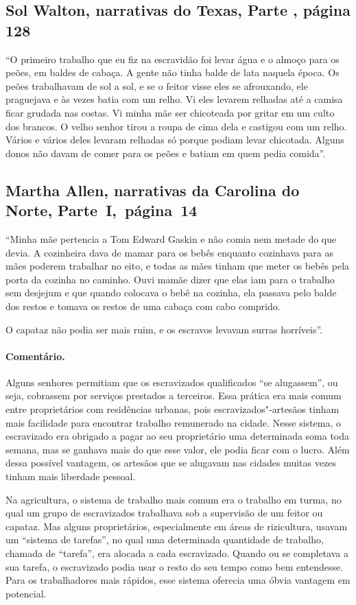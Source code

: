 \subsection{Sol Walton, narrativas do Texas, Parte , página 128}
\label{ref275}

``O primeiro trabalho que eu fiz na escravidão foi levar água e o almoço
para os peões, em baldes de cabaça. A gente não tinha balde de lata
naquela época. Os peões trabalhavam de sol a sol, e se o feitor visse
eles se afrouxando, ele praguejava e às vezes batia com um relho. Vi
eles levarem relhadas até a camisa ficar grudada nas costas. Vi minha
mãe ser chicoteada por gritar em um culto dos brancos. O velho senhor
tirou a roupa de cima dela e castigou com um relho. Vários e vários 
deles levaram relhadas só porque podiam levar chicotada. Alguns donos
não davam de comer para os peões e batiam em quem pedia comida''.

\subsection{Martha Allen, narrativas da Carolina do Norte, Parte~I,~página~14} \label{ref06}

``Minha mãe pertencia a Tom Edward Gaskin e não comia nem metade do que
devia. A cozinheira dava de mamar para os bebês enquanto cozinhava para
as mães poderem trabalhar no eito, e todas as mães tinham que meter os
bebês pela porta da cozinha no caminho. Ouvi mamãe dizer que elas iam
para o trabalho sem desjejum e que quando colocava o bebê na cozinha,
ela passava pelo balde dos restos e tomava os restos de uma cabaça com
cabo comprido.

O capataz não podia ser mais ruim, e os escravos levavam surras
horríveis''.

\paragraph{Comentário.}\quad
{\small
Alguns senhores permitiam que os escravizados qualificados ``se
alugassem'', ou seja, cobrassem por serviços prestados a terceiros. Essa
prática era mais comum entre proprietários com residências urbanas, pois
escravizados"-artesãos tinham mais facilidade para encontrar trabalho
remunerado na cidade. Nesse sistema, o escravizado era obrigado a pagar ao
seu proprietário uma determinada soma toda semana, mas se ganhava mais
do que esse valor, ele podia ficar com o lucro. Além dessa possível
vantagem, os artesãos que se alugavam nas cidades muitas vezes tinham
mais liberdade pessoal.

Na agricultura, o sistema de trabalho mais comum era o trabalho em
turma, no qual um grupo de escravizados trabalhava sob a supervisão de um
feitor ou capataz. Mas alguns proprietários, especialmente em áreas de
rizicultura, usavam um ``sistema de tarefas'', no qual uma determinada
quantidade de trabalho, chamada de ``tarefa'', era alocada a cada
escravizado. Quando ou se completava a sua tarefa, o escravizado podia usar o
resto do seu tempo como bem entendesse. Para os trabalhadores mais
rápidos, esse sistema oferecia uma óbvia vantagem em potencial.
}

